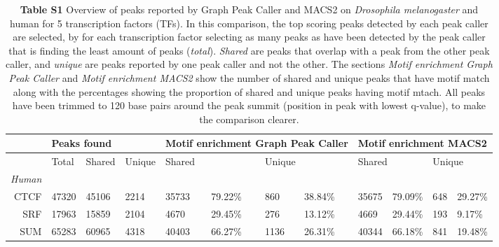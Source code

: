 \documentclass[a4paper,8pt]{article}
\title{}
\author{}
\begin{document}

\begin{table}[]
\begin{adjustwidth}{-1.5in}{0in} %
\centering
\caption*{\textbf{Table S1} Overview of peaks reported by Graph Peak Caller and MACS2 on \emph{Drosophila melanogaster} and human for 5 transcription factors (TFs).
  In this comparison, the top scoring peaks detected by each peak caller are selected, by for each transcription factor selecting as many peaks as have been detected by the peak caller that is finding the least amount of peaks (\emph{total}). 
  \emph{Shared} are peaks that overlap with a peak from the other peak caller, and \emph{unique} are peaks reported by one peak caller and not the other.
  The sections \emph{Motif enrichment Graph Peak Caller} and \emph{Motif enrichment MACS2} show the number of shared and unique peaks that have motif match along with the percentages showing the proportion of shared and unique peaks having motif mtach. All peaks have been trimmed to 120 base pairs around the peak summit (position in peak with lowest q-value), to make the comparison clearer.}
\label{table1}
\begin{tabular}{llllllllllll}
\toprule
 & \multicolumn{3}{|l|}{Peaks found} & \multicolumn{4}{l|}{Motif enrichment Graph Peak Caller}                        & \multicolumn{4}{l}{Motif enrichment MACS2}                       \\ \midrule
 &   \multicolumn{1}{|l}{Total}    &  Shared      &  Unique     & \multicolumn{2}{|l}{Shared} & \multicolumn{2}{l|}{Unique} & \multicolumn{2}{l}{Shared} & \multicolumn{2}{l}{Unique} \\ \midrule
 
\multicolumn{1}{l|}{\emph{Human}} & \multicolumn{11}{l}{} \\

 \multicolumn{1}{r|}{CTCF} & 47320 & 45106 & 2214 & \multicolumn{1}{|l}{35733} & 79.22\% & 860 & 38.84\% & \multicolumn{1}{|l}{35675} & 79.09\% & 648 & 29.27\%\\ 
\multicolumn{1}{r|}{SRF} & 17963 & 15859 & 2104 & \multicolumn{1}{|l}{4670} & 29.45\% & 276 & 13.12\% & \multicolumn{1}{|l}{4669} & 29.44\% & 193 & 9.17\%\\  \midrule
\multicolumn{1}{r|}{SUM} & 65283 & 60965 & 4318 & \multicolumn{1}{|l}{40403} & 66.27\% & 1136 & 26.31\% & \multicolumn{1}{|l}{40344} & 66.18\% & 841 & 19.48\%\\  


\end{tabular}
\end{adjustwidth}
\end{table}
\end{document}

